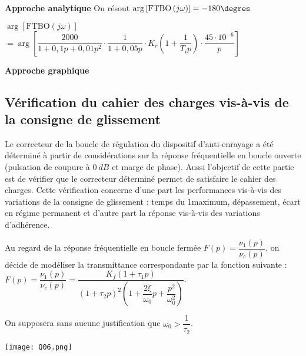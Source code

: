 \begin{corrige}
\textbf{Approche analytique}
On résout $\arg \left[\text{FTBO}\left( j \omega\right)\right] = -180 \degres$ 


$\arg \left[\text{FTBO}\left( j \omega\right)\right]$ 
$ = \arg \left[
\dfrac{2000}{1+0,1p+0,01p^2}
\cdot
\dfrac{1}{1+0,05p}
\cdot 
K_r
 \left(1+\dfrac{1}{T_i p} \right) \cdot 
\dfrac{45\cdot 10^{-6}}{p}
\right] $


\textbf{Approche graphique}

\end{corrige}
\else
\fi

\subsection*{Vérification du cahier des charges vis-à-vis de la consigne de glissement}
\ifprof
\else
Le correcteur de la boucle de régulation du dispositif d’anti-enrayage a été déterminé
à partir de considérations sur la réponse fréquentielle en boucle ouverte
(pulsation de coupure à $\SI{0}{dB}$ et marge de phase). Aussi l’objectif de cette partie
est de vérifier que le correcteur déterminé permet de satisfaire le cahier des charges.
Cette vérification concerne d’une part les performances vis-à-vis des variations
de la consigne de glissement : temps du 1\ier maximum, dépassement, écart
en régime permanent et d’autre part la réponse vis-à-vis des variations d’adhérence.

Au regard de la réponse fréquentielle en boucle fermée $F(p)=\dfrac{\nu_1(p)}{\nu_c(p)}$, on
décide de modéliser la transmittance correspondante par la fonction suivante :
$ F(p)=\dfrac{\nu_1(p)}{\nu_c(p)}=\dfrac{K_f\left( 1+\tau_1 p\right)}{\left( 1+\tau_2 p\right)^2 \left({1+\dfrac{2 \xi }{\omega_0}p+\dfrac{p^2}{\omega_0^2}} \right)} $.

On supposera sans aucune justification que $\omega_0 > \dfrac{1}{\tau_2}$.

\fi


\ifprof
\else
\begin{marginfigure}
\texttt{[image: Q06.png]}
\end{marginfigure}
\fi


